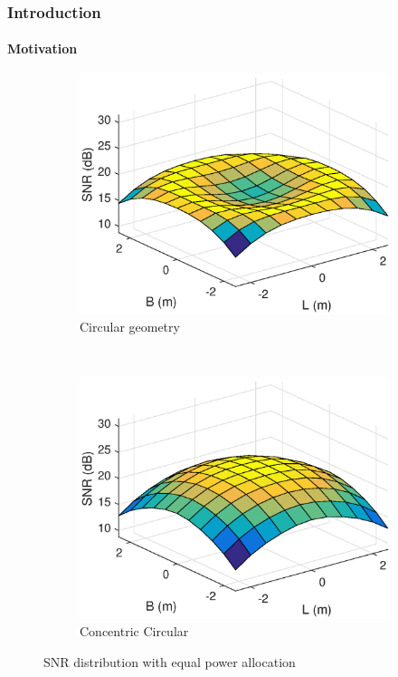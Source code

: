 \documentclass{beamer}
\theoremstyle{remark}
\begin{document}
\begin{frame}
\frametitle{Introduction}
\framesubtitle{Motivation}

\begin{figure}[h!]
    \centering

    \begin{subfigure}[t]{.5\columnwidth}
        \centering
         \includegraphics[width=\columnwidth]{circleNoPowerDist_new}
        \caption{Circular geometry}
\label{fig2:subfig1}        
    \end{subfigure}%
    ~ 
    \begin{subfigure}[t]{.5\columnwidth}
        \centering
        \includegraphics[width=\columnwidth]{concircleNoPowerDist_new}
        \caption{Concentric Circular }
\label{fig2:subfig2}
    \end{subfigure}
    \caption{SNR distribution with equal power allocation}
    \label{fig:SNRDistCircles}
    \end{figure}
\end{frame}
\end{document}
